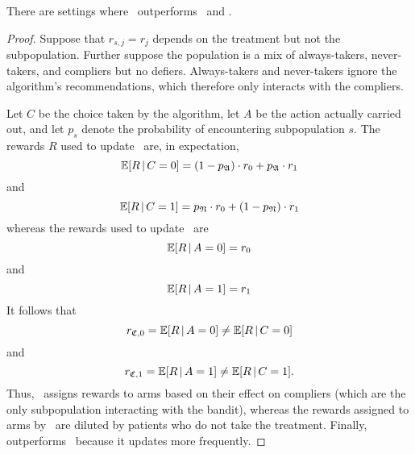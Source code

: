\begin{prop}\label{prop:actual}
	There are settings where \actual\, outperforms \chosen\, and \comply.
\end{prop}
\begin{proof}
	Suppose that $r_{s,j}=r_j$ depends on the treatment but not the subpopulation. Further suppose the population is a mix of always-takers, never-takers, and compliers but no defiers. 
	Always-takers and never-takers ignore the algorithm's recommendations, which therefore only interacts with the compliers. 

   Let $C$ be the choice taken by the algorithm, let $A$ be the action actually carried out, and let $p_s$ denote the probability of encountering subpopulation $s$.
	The rewards $R$ used to update \chosen\, are, in expectation, 
	\begin{equation}
		\operatorname*{\mathbb E}[R\,|\,C=0] 
		= (1-p_{\mathfrak A})\cdot r_0 + p_{\mathfrak A}\cdot r_1
	\end{equation} and 
	\begin{equation}
		\operatorname*{\mathbb E}[R\,|\,C=1]
		= p_{\mathfrak N}\cdot r_0 + (1-p_{\mathfrak N})\cdot r_1
	\end{equation}
	whereas the rewards used to update \actual\, are
	\begin{equation}
	   \operatorname*{\mathbb E}[R\,|\,A=0] = r_0
	\end{equation} and 
	\begin{equation}
	\operatorname*{\mathbb E}[R\,|\,A=1] = r_1
	\end{equation}
	It follows that
	\begin{equation}
		r_{{\mathfrak C},0} = \operatorname*{\mathbb E}[R\,|\,A=0] \neq \operatorname*{\mathbb E}[R\,|\,C=0]
	\end{equation} and 
	\begin{equation}
		r_{{\mathfrak C},1} = \operatorname*{\mathbb E}[R\,|\,A=1] \neq \operatorname*{\mathbb E}[R\,|\,C=1].
	\end{equation}
	Thus, \actual\, assigns rewards to arms based on their effect on compliers (which are the only subpopulation interacting with the bandit), whereas the rewards assigned to arms by \chosen\, are diluted by patients who do not take the treatment. Finally, \actual\, outperforms \comply\, because it updates more frequently.
\end{proof}

